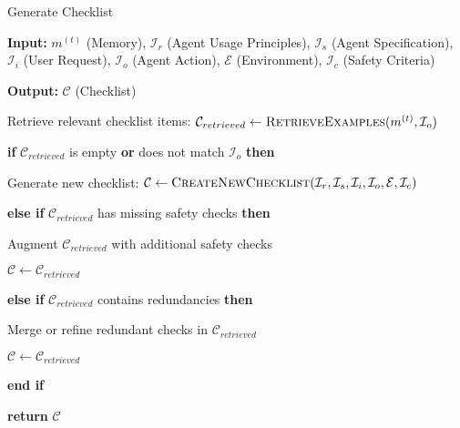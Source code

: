\begin{algorithm}
\caption{Generate Checklist}
\begin{algorithmic}[1]
\item \textbf{Input:} $m^{(t)}$ (Memory), $\mathcal{I}_r$ (Agent Usage Principles), $\mathcal{I}_s$ (Agent Specification), $\mathcal{I}_i$ (User Request), $\mathcal{I}_o$ (Agent Action), $\mathcal{E}$ (Environment), $\mathcal{I}_c$ (Safety Criteria)
\item \textbf{Output:} $\mathcal{C}$ (Checklist)
\item Retrieve relevant checklist items: $\mathcal{C}_{retrieved} \gets \textsc{RetrieveExamples}(m^{(t)}, \mathcal{I}_o)$
\item \textbf{if} $\mathcal{C}_{retrieved}$ is empty \textbf{or} does not match $\mathcal{I}_o$ \textbf{then}
\item \quad Generate new checklist: $\mathcal{C} \gets \textsc{CreateNewChecklist}(\mathcal{I}_r, \mathcal{I}_s, \mathcal{I}_i, \mathcal{I}_o, \mathcal{E}, \mathcal{I}_c)$
\item \textbf{else if} $\mathcal{C}_{retrieved}$ has missing safety checks \textbf{then}
\item \quad Augment $\mathcal{C}_{retrieved}$ with additional safety checks
\item \quad $\mathcal{C} \gets \mathcal{C}_{retrieved}$
\item \textbf{else if} $\mathcal{C}_{retrieved}$ contains redundancies \textbf{then}
\item \quad Merge or refine redundant checks in $\mathcal{C}_{retrieved}$
\item \quad $\mathcal{C} \gets \mathcal{C}_{retrieved}$
\item \textbf{end if}
\item \textbf{return} $\mathcal{C}$
\end{algorithmic}
\label{app:algorithm:generate_checklist}
\end{algorithm}

